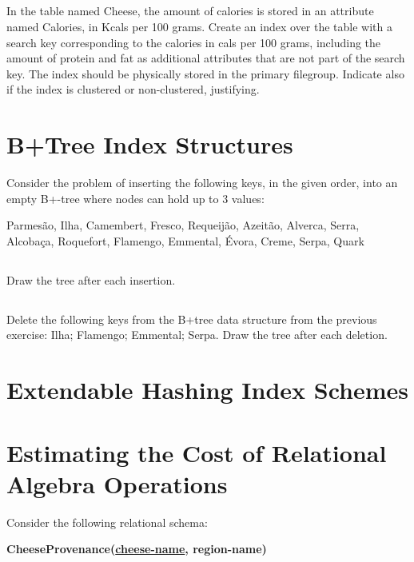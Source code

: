 \documentclass[11pt,report]{article}
\newcommand{\tab}{\hspace*{3em}}
\begin{document}
	\subsection{}
	{\color{gray}In the table named Cheese, the amount of calories is stored in an attribute named Calories, in Kcals per 100 grams. Create an index over the table with a search key corresponding to the calories in cals per 100 grams, including the amount of protein and fat as additional attributes that are not part of the search key. The index should be physically stored in the primary filegroup. Indicate also if the index is clustered or non-clustered, justifying.}

\section{B+Tree Index Structures}
	{\color{gray}Consider the problem of inserting the following keys, in the given order, into an empty B+-tree where nodes can hold up to 3 values:}
	
	{\color{gray}Parmesão, Ilha, Camembert, Fresco, Requeijão, Azeitão, Alverca, Serra, Alcobaça, Roquefort, Flamengo, Emmental, Évora, Creme, Serpa, Quark}

	\subsection{}
	{\color{gray}Draw the tree after each insertion.}


	\subsection{}
	{\color{gray}Delete the following keys from the B+tree data structure from the previous exercise: Ilha; Flamengo; Emmental; Serpa. Draw the tree after each deletion.}

\section{Extendable Hashing Index Schemes}


\section{Estimating the Cost of Relational Algebra Operations}
	{\color{gray}Consider the following relational schema:}
	
	\textbf{\color{gray}\tab CheeseProvenance(\underline{cheese-name}, region-name)}
\end{document}
